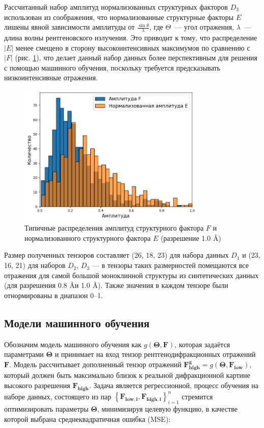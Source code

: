 Рассчитанный набор амплитуд нормализованных структурных факторов $D_3$ использован из соображения, что нормализованные структурные факторы $E$ лишены явной зависимости амплитуды от $\frac{\sin \theta}{\lambda}$, где $\Theta$~--- угол отражения, $\lambda$~--- длина волны рентгеновского излучения. Это приводит к тому, что распределение $|E|$ менее смещено в сторону высокоинтенсивных максимумов по сравнению
 с $|F|$ (рис. \ref{amplfehist}), что делает данный набор данных более перспективным для решения с помощью машинного обучения, поскольку требуется предсказывать низкоинтенсивные отражения.
 
\begin{figure}[H]
			\centering
            \includegraphics[width=0.8\textwidth]{figures/amplfehist.png}
            \caption{Типичные распределения амплитуд структурного фактора $F$ и нормализованного структурного фактора $E$ (разрешение 1.0 \AA)}
            \label{amplfehist}
\end{figure}

Размер полученных тензоров составляет (26, 18, 23) для набора данных $D_1$ и (23, 16, 21) для наборов $D_2$, $D_3$ --- в тензоры таких размерностей помещаются все отражения для самой большой моноклинной структуры из синтетических данных (для разрешения 0.8 \AA и 1.0 \AA). Также значения в каждом тензоре были отнормированы в диапазон 0--1.

 

\subsection{Модели машинного обучения}

Обозначим модель машинного обучения как $g(\mathbf{\Theta}, \mathbf{F})$, которая задаётся параметрами $\mathbf{\Theta}$ и принимает на вход тензор рентгенодифракционных отражений $\mathbf{F}$. Модель рассчитывает дополненный тензор отражений $\mathbf{F_{high}^g} = g(\mathbf{\Theta}, \mathbf{F_{low}})$, который должен быть максимально близок к реальной дифракционной картине высокого разрешения $\mathbf{F_{high}}$. Задача является регрессионной, процесс обучения на наборе данных, состоящего из пар $\left\lbrace\mathbf{F_{low, i}, F_{high, i}}\right\rbrace^n_{i=1}$ стремится оптимизировать параметры $\mathbf{\Theta}$, минимизируя целевую функцию, в качестве которой выбрана среднеквадратичная ошибка (MSE):

